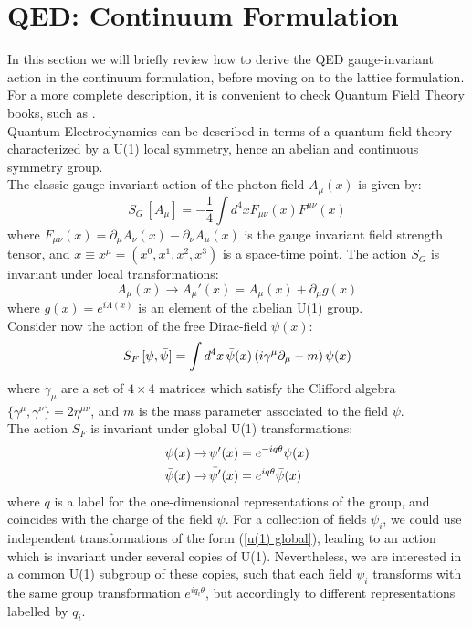 \section{QED: Continuum Formulation}
In this section we will briefly review how to derive the QED gauge-invariant action in the continuum formulation, before moving on to the lattice formulation. For a more complete description, it is convenient to check Quantum Field Theory books, such as \cite{Peskin:1995ev, Rothe:1992nt}.
\\ Quantum Electrodynamics can be described in terms of a quantum field theory characterized by a U(1) local symmetry, hence an abelian and continuous symmetry group. 
\\ The classic gauge-invariant action of the photon field $A_\mu(x)$ is given by:
\begin{equation}\label{S_G}
    S_G\,[A_\mu] = - \frac{1}{4} \int d^4x F_{\mu \nu}(x) F^{\mu\nu}(x)
\end{equation}
where $F_{\mu \nu} (x) = \partial_\mu A_\nu(x) - \partial_\nu A_\mu(x)$ is the gauge invariant field strength tensor, and $x \equiv x^\mu = (x^0, x^1, x^2, x^3)$ is a space-time point. The action $S_G$ is invariant under local transformations:
\begin{equation}
    A_\mu(x) \to A_\mu'(x) = A_\mu(x) + \partial_\mu g(x)
\end{equation}
where $g(x) = e^{i\Lambda(x)}$ is an element of the abelian U(1) group.
\\ Consider now the action of the free Dirac-field $\psi(x)$:
\begin{equation}
    S_F \, [\psi, \Bar{\psi}] = \int d^4 x \, \Bar{\psi}(x) \left(i \gamma^{\mu} \partial_\mu - m \right) \psi(x)
\end{equation}
where $\gamma_\mu$ are a set of $4 \times 4$ matrices which satisfy the Clifford algebra $\{\gamma^\mu, \gamma^\nu\} = 2 \eta^{\mu\nu}$, and $m$ is the mass parameter associated to the field $\psi$.
\\ The action $S_F$ is invariant under global U(1) transformations:
\begin{equation}\label{u(1) global}
    \begin{split}
        \psi (x) \to & \, \psi'(x) = e^{-iq\theta}\psi(x) \\
        \Bar{\psi} (x) \to & \, \Bar{\psi'}(x) = e^{iq\theta}\Bar{\psi}(x) \\
    \end{split}
\end{equation}
where $q$ is a label for the one-dimensional representations of the group, and coincides with the charge of the field $\psi$. For a collection of fields $\psi_i$, we could use independent transformations of the form (\ref{u(1) global}), leading to an action which is invariant under several copies of U(1). Nevertheless, we are interested in a common U(1) subgroup of these copies, such that each field $\psi_i$ transforms with the same group transformation $e^{iq_i\theta}$, but accordingly to different representations labelled by $q_i$.
